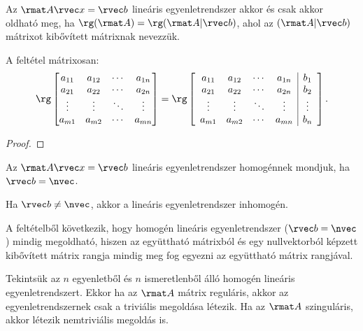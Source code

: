 \begin{theorem}
  Az $\rmat A \rvec x = \rvec b$ lineáris egyenletrendszer akkor és csak
  akkor oldható meg, ha $\rg(\rmat A) = \rg(\rmat A | \rvec b)$, ahol az
  $(\rmat A | \rvec b)$ mátrixot kibővített mátrixnak nevezzük.

  A feltétel mátrixosan:
  \[
    \rg \begin{bmatrix}
      a_{11} & a_{12} & \cdots & a_{1n} \\
      a_{21} & a_{22} & \cdots & a_{2n} \\
      \vdots & \vdots & \ddots & \vdots \\
      a_{m1} & a_{m2} & \cdots & a_{mn}
    \end{bmatrix} = \rg \left[\begin{array}{cccc|c}
        a_{11} & a_{12} & \cdots & a_{1n} & b_1    \\
        a_{21} & a_{22} & \cdots & a_{2n} & b_2    \\
        \vdots & \vdots & \ddots & \vdots & \vdots \\
        a_{m1} & a_{m2} & \cdots & a_{mn} & b_n
      \end{array}\right]\text.
  \]

  \begin{proof}
    \vspace{8em}
  \end{proof}
\end{theorem}

\begin{definition}
  Az $\rmat A \rvec x = \rvec b$ lineáris egyenletrendszer homogénnek mondjuk,
  ha $\rvec b = \nvec$.

  Ha $\rvec b \neq \nvec$, akkor a lineáris egyenletrendszer inhomogén.
\end{definition}

\begin{note}
  A feltételből következik, hogy homogén lineáris egyenletrendszer
  ($\rvec b = \nvec$) mindig megoldható, hiszen az együttható mátrixból és egy
  nullvektorból képzett kibővített mátrix rangja mindig meg fog egyezni az
  együttható mátrix rangjával.
\end{note}

\begin{note}
  Tekintsük az $n$ egyenletből és $n$ ismeretlenből álló homogén lineáris
  egyenletrendszert. Ekkor ha az $\rmat A$ mátrix reguláris, akkor az
  egyenletrendszernek csak a triviális megoldása létezik. Ha az $\rmat A$
  szinguláris, akkor létezik nemtriviális megoldás is.
\end{note}

